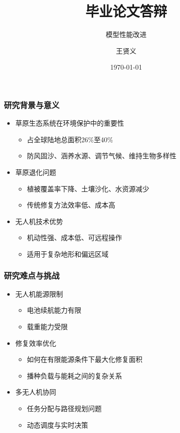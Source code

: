 \documentclass[9pt, aspectratio=169]{beamer}  %
\title{毕业论文答辩}
\subtitle{模型性能改进}
\author{王贤义}
\date{\today}
\begin{document}
\begin{frame}
	\titlepage
\end{frame}
\begin{frame}
	\frametitle{研究背景与意义}
	\begin{itemize}
		\item 草原生态系统在环境保护中的重要性
		      \begin{itemize}
			      \item 占全球陆地总面积26\%至40\%
			      \item 防风固沙、涵养水源、调节气候、维持生物多样性
		      \end{itemize}
		\item 草原退化问题
		      \begin{itemize}
			      \item 植被覆盖率下降、土壤沙化、水资源减少
			      \item 传统修复方法效率低、成本高
		      \end{itemize}
		\item 无人机技术优势
		      \begin{itemize}
			      \item 机动性强、成本低、可远程操作
			      \item 适用于复杂地形和偏远区域
		      \end{itemize}
	\end{itemize}
\end{frame}

\begin{frame}
	\frametitle{研究难点与挑战}
	\begin{itemize}
		\item 无人机能源限制
		      \begin{itemize}
			      \item 电池续航能力有限
			      \item 载重能力受限
		      \end{itemize}
		\item 修复效率优化
		      \begin{itemize}
			      \item 如何在有限能源条件下最大化修复面积
			      \item 播种负载与能耗之间的复杂关系
		      \end{itemize}
		\item 多无人机协同
		      \begin{itemize}
			      \item 任务分配与路径规划问题
			      \item 动态调度与实时决策
		      \end{itemize}
	\end{itemize}
\end{frame}
\end{document}
